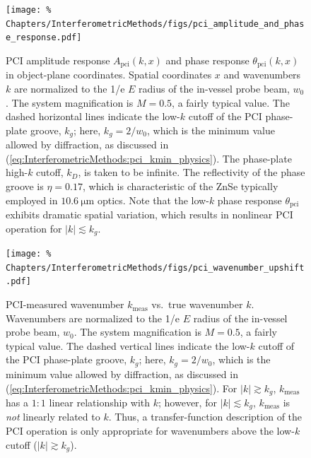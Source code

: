 \begin{figure}
  \centering
  \texttt{[image: \%
    Chapters/InterferometricMethods/figs/pci\_amplitude\_and\_phase\_response.pdf]}
    \caption[PCI amplitude and phase responses in object-plane coordinates
    ]{%
    PCI amplitude response $A_{\text{pci}}(k, x)$ and
    phase response $\theta_{\text{pci}}(k, x)$
    in object-plane coordinates.
    Spatial coordinates $x$ and wavenumbers $k$ are normalized
    to the 1/e $E$ radius of the in-vessel probe beam, $w_0$.
    The system magnification is $M = 0.5$, a fairly typical value.
    The dashed horizontal lines indicate
    the low-$k$ cutoff of the PCI phase-plate groove, $k_g$;
    here, $k_g = 2 / w_0$,
    which is the minimum value allowed by diffraction,
    as discussed in
    (\ref{eq:InterferometricMethods:pci_kmin_physics}).
    The phase-plate high-$k$ cutoff, $k_D$,
    is taken to be infinite.
    The reflectivity of the phase groove is $\eta = 0.17$,
    which is characteristic of the ZnSe typically
    employed in $\SI{10.6}{\micro\meter}$ optics.
    Note that the low-$k$ phase response $\theta_{\text{pci}}$
    exhibits dramatic spatial variation,
    which results in nonlinear PCI operation for $|k| \lesssim k_g$.
  }
\label{fig:InterferometricMethods:phase_plate_amplitude_and_phase_response}
\end{figure}

\begin{figure}
  \centering
  \texttt{[image: \%
    Chapters/InterferometricMethods/figs/pci\_wavenumber\_upshift.pdf]}
    \caption[Nonlinear upshift in low-$k$, PCI-measured wavenumber]{%
    PCI-measured wavenumber $k_{\text{meas}}$ vs.\ true wavenumber $k$.
    Wavenumbers are normalized
    to the 1/e $E$ radius of the in-vessel probe beam, $w_0$.
    The system magnification is $M = 0.5$, a fairly typical value.
    The dashed vertical lines indicate
    the low-$k$ cutoff of the PCI phase-plate groove, $k_g$;
    here, $k_g = 2 / w_0$,
    which is the minimum value allowed by diffraction,
    as discussed in
    (\ref{eq:InterferometricMethods:pci_kmin_physics}).
    For $|k| \gtrsim k_g$,
    $k_{\text{meas}}$ has a $1:1$ linear relationship with $k$;
    however, for $|k| \lesssim k_g$,
    $k_{\text{meas}}$ is \emph{not} linearly related to $k$.
    Thus, a transfer-function description of the PCI operation
    is only appropriate for wavenumbers above the low-$k$ cutoff
    ($|k| \gtrsim k_g$).
  }
\label{fig:InterferometricMethods:pci_wavenumber_upshift}
\end{figure}

